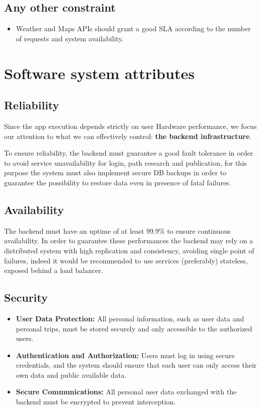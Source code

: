 \documentclass{Configuration_Files/PoliMi3i_thesis}
\begin{document}
\subsection{Any other constraint }
\begin{itemize}
    \item Weather and Maps APIs should grant a good SLA according to the number of requests and system availability.
\end{itemize}

\newpage
\section{Software system attributes}
\subsection{Reliability}
Since the app execution depends strictly on user Hardware performance, we focus our attention to what we can effectively control: \textbf{the backend infrastructure}.

To ensure reliability, the backend must guarantee a good fault tolerance in order to avoid service unavailability for login, path research and publication, for this purpose the system must also implement secure DB backups in order to guarantee the possibility to restore data even in presence of fatal failures.

\subsection{Availability}

The backend must have an uptime of at least 99.9\% to ensure continuous availability.
In order to guarantee these performances the backend may rely on a distributed system with high replication and consistency, avoiding single point of failures, indeed it would be recommended to use services (preferably) stateless, exposed behind a load balancer. 

\subsection{Security}
\begin{itemize}
    \item \textbf{User Data Protection:}  
    All personal information, such as user data and personal trips, must be stored securely and only accessible to the authorized users. 
    \item \textbf{Authentication and Authorization:}  
    Users must log in using secure credentials, and the system should ensure that each user can only access their own data and public available data.  
    \item \textbf{Secure Communications:}  
    All personal user data exchanged with the backend must be encrypted to prevent interception.
\end{itemize}
\end{document}
